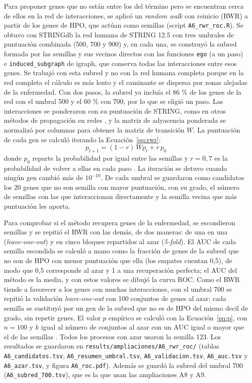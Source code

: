 Para proponer genes que no están entre los del término pero se encuentran cerca de ellos en la red de interacciones, se aplicó un \textit{random walk} con reinicio (RWR) \cite{Kohler2008} a partir de los genes de HPO, que actúan como semillas (script \texttt{A6\_rwr\_roc.R}). Se obtuvo con STRINGdb la red humana de STRING 12.5 con tres umbrales de puntuación combinada (500, 700 y 900) y, en cada una, se construyó la subred formada por las semillas y sus vecinos directos con las funciones \texttt{ego} (a un paso) e \texttt{induced\_subgraph} de igraph, que conserva todas las interacciones entre esos genes. Se trabajó con esta subred y no con la red humana completa porque en la red completa el cálculo es más lento y el caminante se dispersa por zonas alejadas de la enfermedad. Con dos pasos, la subred ya incluía el 86 \% de los genes de la red con el umbral 500 y el 60 \% con 700, por lo que se eligió un paso. Las interacciones se ponderaron con su puntuación de STRING, como en otros métodos de propagación en redes \cite{Vanunu2010,PicartArmada2019}, y la matriz de adyacencia ponderada se normalizó por columnas para obtener la matriz de transición $W$. La puntuación de cada gen se calculó iterando la Ecuación~\ref{eq:rwr}:
\begin{equation}
	p_{t+1} = (1 - r)\,W p_t + r\,p_0
	\label{eq:rwr}
\end{equation}
donde $p_0$ reparte la probabilidad por igual entre las semillas y $r = 0{,}7$ es la probabilidad de volver a ellas en cada paso \cite{Kohler2008}. La iteración se detuvo cuando ningún gen cambió más de $10^{-10}$. De cada umbral se guardaron como candidatos los 20 genes que no son semilla con mayor puntuación, con su grado, el número de semillas con las que interaccionan directamente y la semilla vecina que más puntuación les aporta.

Para comprobar si el método recupera genes de la enfermedad, se escondieron semillas y se repitió el RWR con las demás, de dos maneras: de una en una (\textit{leave-one-out}) y en cinco bloques repartidos al azar (\textit{5-fold}). El AUC de cada semilla escondida se calculó a mano como la fracción de genes de la subred que no son de HPO con menor puntuación que ella (los empates cuentan 0,5), de modo que 0,5 corresponde al azar y 1 a una recuperación perfecta; el AUC del método es la media, y con estos valores se dibujó la curva ROC. Como el RWR tiende a favorecer a los genes con muchas interacciones, con el umbral 700 se repitió la validación \textit{leave-one-out} con 100 conjuntos de genes al azar: cada semilla se sustituyó por un gen de la subred que no es de HPO del mismo decil de grado, sin repetir genes. El valor $p$ empírico se calculó con la Ecuación~\ref{eq:p}, con $n = 100$ y $k$ igual al número de conjuntos al azar con un AUC igual o mayor que el de las semillas \cite{Phipson2010}. Todos los procesos con azar usaron la semilla 123. Los resultados se guardaron en \texttt{results/ampliaciones/A6\_rwr\_roc/} (tablas \texttt{A6\_candidatos.tsv}, \texttt{A6\_resumen\_umbral.tsv}, \texttt{A6\_validacion.tsv}, \texttt{A6\_auc.tsv} y \texttt{A6\_azar.tsv}, y figura \texttt{A6\_roc.pdf}). Además se guardó la subred del umbral 700 (\texttt{A6\_subred\_700.tsv}), que es la que usan las ampliaciones A8 y A9.

